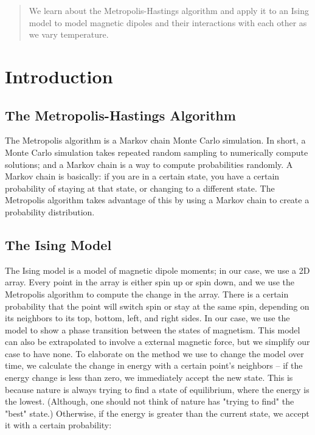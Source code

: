\documentclass[12pt]{article}
\begin{document}
\maketitle

\begin{abstract}
We learn about the Metropolis-Hastings algorithm and apply it to an Ising model to model magnetic dipoles and their interactions with each other as we vary temperature.
\end{abstract}

\section{Introduction}

\subsection*{The Metropolis-Hastings Algorithm}

The Metropolis algorithm is a Markov chain Monte Carlo simulation. In short, a Monte Carlo simulation takes repeated random sampling to numerically compute solutions; and a Markov chain is a way to compute probabilities randomly. A Markov chain is basically: if you are in a certain state, you have a certain probability of staying at that state, or changing to a different state. The Metropolis algorithm takes advantage of this by using a Markov chain to create a probability distribution. 

\subsection*{The Ising Model}

The Ising model is a model of magnetic dipole moments; in our case, we use a 2D array. Every point in the array is either spin up or spin down, and we use the Metropolis algorithm to compute the change in the array. There is a certain probability that the point will switch spin or stay at the same spin, depending on its neighbors to its top, bottom, left, and right sides. In our case, we use the model to show a phase transition between the states of magnetism. This model can also be extrapolated to involve a external magnetic force, but we simplify our case to have none. To elaborate on the method we use to change the model over time, we calculate the change in energy with a certain point's neighbors -- if the energy change is less than zero, we immediately accept the new state. This is because nature is always trying to find a state of equilibrium, where the energy is the lowest. (Although, one should not think of nature has "trying to find" the "best" state.) Otherwise, if the energy is greater than the current state, we accept it with a certain probability:
\end{document}
